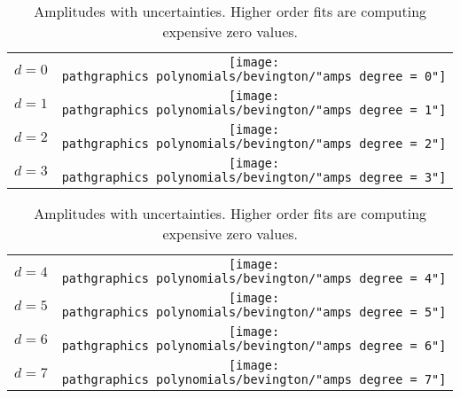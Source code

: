 \begin{table}[t]
	\begin{center}
		\begin{tabular}{lc}
		  $d = 0$ & \raisebox{-0.545\height}{\texttt{[image: \\pathgraphics polynomials/bevington/"amps degree = 0"]}} \\[80pt]
		  $d = 1$ & \raisebox{-0.545\height}{\texttt{[image: \\pathgraphics polynomials/bevington/"amps degree = 1"]}} \\[80pt]
		  $d = 2$ & \raisebox{-0.545\height}{\texttt{[image: \\pathgraphics polynomials/bevington/"amps degree = 2"]}} \\[80pt]
		  $d = 3$ & \raisebox{-0.545\height}{\texttt{[image: \\pathgraphics polynomials/bevington/"amps degree = 3"]}} \\[80pt]
		\end{tabular}
	\end{center}
	\caption{Amplitudes with uncertainties. Higher order fits are computing expensive zero values.}
\end{table}%

\begin{table}[t]
	\begin{center}
		\begin{tabular}{lc}
		  $d = 4$ & \raisebox{-0.545\height}{\texttt{[image: \\pathgraphics polynomials/bevington/"amps degree = 4"]}} \\[80pt]
		  $d = 5$ & \raisebox{-0.545\height}{\texttt{[image: \\pathgraphics polynomials/bevington/"amps degree = 5"]}} \\[80pt]
		  $d = 6$ & \raisebox{-0.545\height}{\texttt{[image: \\pathgraphics polynomials/bevington/"amps degree = 6"]}} \\[80pt]
		  $d = 7$ & \raisebox{-0.545\height}{\texttt{[image: \\pathgraphics polynomials/bevington/"amps degree = 7"]}} \\[80pt]
		\end{tabular}
	\end{center}
	\caption{Amplitudes with uncertainties. Higher order fits are computing expensive zero values.}
\end{table}%

\endinput  %

